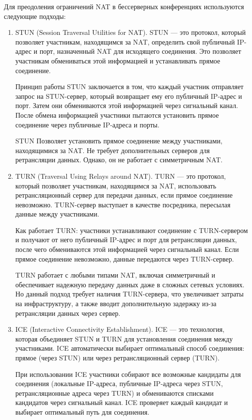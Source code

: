 Для преодоления ограничений NAT в бессерверных конференциях используются следующие подходы:
\begin{enumerate}
  \item STUN (Session Traversal Utilities for NAT).
  STUN --- это протокол, который позволяет участникам, находящимся за NAT, определить свой публичный IP-адрес и порт, назначенный NAT для исходящего соединения.
  Это позволяет участникам обмениваться этой информацией и устанавливать прямое соединение.
  
  Принцип работы STUN заключается в том, что каждый участник отправляет запрос на STUN-сервер, который возвращает ему его публичный IP-адрес и порт.
  Затем они обмениваются этой информацией через сигнальный канал.
  После обмена информацией участники пытаются установить прямое соединение через публичные IP-адреса и порты.
  
  STUN Позволяет установить прямое соединение между участниками, находящимися за NAT.
  Не требует дополнительных серверов для ретрансляции данных.
  Однако, он не работает с симметричным NAT.
  
  \item TURN (Traversal Using Relays around NAT).
  TURN --- это протокол, который позволяет участникам, находящимся за NAT, использовать ретрансляционный сервер для передачи данных, если прямое соединение невозможно.
  TURN-сервер выступает в качестве посредника, пересылая данные между участниками.
  
  Как работает TURN: участники устанавливают соединение с TURN-сервером и получают от него публичный IP-адрес и порт для ретрансляции данных, после чего обмениваются этой информацией через сигнальный канал.
  Если прямое соединение невозможно, данные передаются через TURN-сервер.
  
  TURN работает с любыми типами NAT, включая симметричный и обеспечивает надежную передачу данных даже в сложных сетевых условиях.
  Но данный подход требует наличия TURN-сервера, что увеличивает затраты на инфраструктуру, а также вводит дополнительную задержку из-за ретрансляции данных через сервер.
  
  \item ICE (Interactive Connectivity Establishment).
  ICE --- это технология, которая объединяет STUN и TURN для установления соединения между участниками.
  ICE автоматически выбирает оптимальный способ соединения: прямое (через STUN) или через ретрансляционный сервер (TURN).
  
  При использовании ICE участники собирают все возможные кандидаты для соединения (локальные IP-адреса, публичные IP-адреса через STUN, ретрансляционные адреса через TURN) и обмениваются списками кандидатов через сигнальный канал.
  ICE проверяет каждый кандидат и выбирает оптимальный путь для соединения.
  

\end{enumerate}
